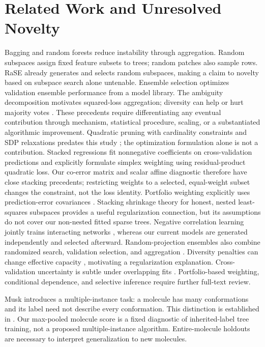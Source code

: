\section{Related Work and Unresolved Novelty}
Bagging \citep{breiman1996} and random forests \citep{breiman2001} reduce instability
through aggregation. Random subspaces \citep{ho1998} assign fixed feature subsets
to trees; random patches \citep{louppe2012} also sample rows. RaSE
\citep{tian2021} already generates and selects random subspaces, making a claim
to novelty based on subspace search alone untenable. Ensemble selection
\citep{caruana2004} optimizes validation ensemble performance from a model library.
The ambiguity decomposition \citep{krogh1995} motivates squared-loss aggregation;
diversity can help or hurt majority votes \citep{brown2010}. These precedents
require differentiating any eventual contribution through mechanism, statistical
procedure, scaling, or a substantiated algorithmic improvement.
Quadratic pruning with cardinality constraints and SDP relaxations predates this
study \citep{zhang2006}; the optimization formulation alone is not a contribution.
Stacked regressions \citep{breiman1996stacked} fit nonnegative coefficients on
cross-validation predictions and explicitly formulate simplex weighting using
residual-product quadratic loss. Our co-error matrix and scalar affine diagnostic
therefore have close stacking precedents; restricting weights to a selected,
equal-weight subset changes the constraint, not the loss identity.
Portfolio weighting explicitly uses prediction-error covariances
\citep{perez2023portfolio}. Stacking shrinkage theory for honest, nested
least-squares subspaces \citep{chen2023stacking} provides a useful regularization
connection, but its assumptions do not cover our non-nested fitted sparse trees.
Negative correlation learning jointly trains interacting networks
\citep{liu1999}, whereas our current models are generated independently and
selected afterward. Random-projection ensembles also combine randomized search,
validation selection, and aggregation \citep{cannings2017}. Diversity penalties
can change effective capacity \citep{reeve2018}, motivating a regularization
explanation. Cross-validation uncertainty is subtle under overlapping fits
\citep{bengio2004,bates2024}. Portfolio-based weighting, conditional
dependence, and selective inference require further full-text review.

Musk introduces a multiple-instance task: a molecule has many conformations and
its label need not describe every conformation. This distinction is established
in \citet{dietterich1997mil}. Our max-pooled molecule score is a fixed diagnostic
of inherited-label tree training, not a proposed multiple-instance algorithm.
Entire-molecule holdouts are necessary to interpret generalization to new molecules.
